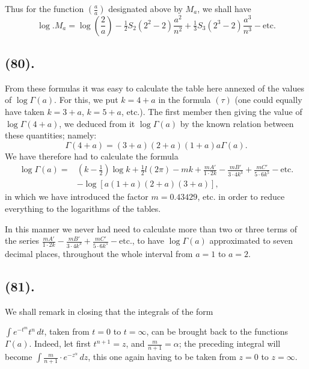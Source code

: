 \documentclass{article}
\begin{document}
Thus for the function $\left(\frac{a}{a}\right)$ designated above by $M_{a}$, we shall have
\[ \log.M_{a}=\log\left(\frac{2}{a}\right)-\tfrac{1}{2}S_{2}(2^{2}-2)\frac{a^{2}}{n^{2}}+\tfrac{1}{3}S_{3}(2^{3}-2)\frac{a^{3}}{n^{3}}-\text{etc.} \]

\subsection*{(80).}

From these formulas it was easy to calculate the table here annexed of the values of $\log\Gamma(a)$. For this, we put $k=4+a$ in the formula $(\tau)$ (one could equally have taken $k=3+a$, $k=5+a$, etc.). The first member then giving the value of $\log\Gamma(4+a)$, we deduced from it $\log\Gamma(a)$ by the known relation between these quantities; namely:
\[ \Gamma(4+a)=(3+a)(2+a)(1+a)a\Gamma(a). \]
We have therefore had to calculate the formula
\[ \begin{aligned} \log\Gamma(a)={}&\left(k-\tfrac{1}{2}\right)\log k+\tfrac{1}{2}l(2\pi)-mk+\frac{mA'}{1\cdot2k}-\frac{mB'}{3\cdot4k^{3}}+\frac{mC'}{5\cdot6k^{5}}-\text{etc.}\\ &-\log[a(1+a)(2+a)(3+a)], \end{aligned} \]
in which we have introduced the factor $m=0.43429$, etc. in order to reduce everything to the logarithms of the tables.

In this manner we never had need to calculate more than two or three terms of the series $\frac{mA'}{1\cdot2k}-\frac{mB'}{3\cdot4k^{3}}+\frac{mC'}{5\cdot6k^{5}}-\text{etc.}$, to have $\log\Gamma(a)$ approximated to seven decimal places, throughout the whole interval from $a=1$ to $a=2$.

\subsection*{(81).}

We shall remark in closing that the integrals of the form

$\displaystyle\int e^{-t^{m}}t^{n}\,dt$, taken from $t=0$ to $t=\infty$, can be brought back to the functions $\Gamma(a)$. Indeed, let first $t^{n+1}=z$, and $\frac{m}{n+1}=\alpha$; the preceding integral will become $\displaystyle\int\frac{m}{n+1}\cdot e^{-z^{\alpha}}\,dz$, this one again having to be taken from $z=0$ to $z=\infty$.
\end{document}
